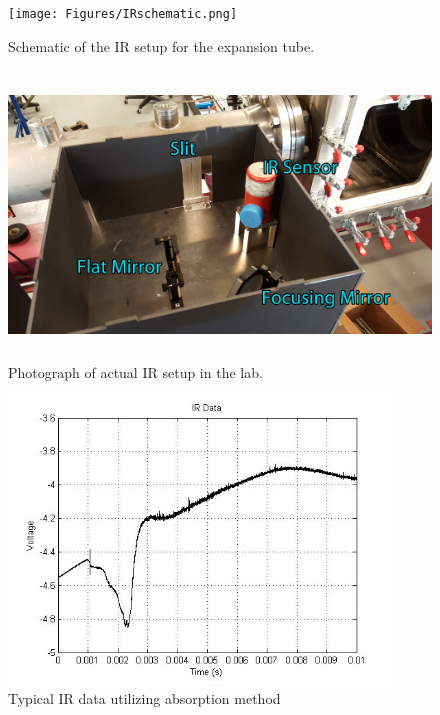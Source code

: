 \begin{figure}
\centering
\texttt{[image: Figures/IRschematic.png]}
\caption[IR setup diagram]{Schematic of the IR setup for the expansion tube.}
\label{fig:IRschematic}
\end{figure}

\begin{figure}
\centering
\includegraphics[height = 3in]{Figures/IRLabeled.jpg}
\caption[Labeled photograph of IR setup]{Photograph of actual IR setup in the lab.}
\label{fig:IRlabel}
\end{figure}

\begin{figure}
\centering
\includegraphics[height = 3in]{Figures/absorption.jpg}
\caption[Typical IR data utilizing absorption method]{Typical IR data utilizing absorption method}
\label{fig:IRabsorption}
\end{figure}

